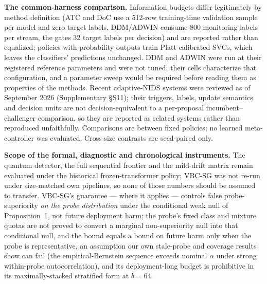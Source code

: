 \documentclass[a4paper,fleqn]{cas-sc}
\begin{document}
\textbf{The common-harness comparison.} Information budgets differ legitimately by method definition (ATC and DoC use a 512-row training-time validation sample per model and zero target labels, DDM/ADWIN consume 800 monitoring labels per stream, the gates 32 target labels per decision) and are reported rather than equalized; policies with probability outputs train Platt-calibrated SVCs, which leaves the classifiers' predictions unchanged. DDM and ADWIN were run at their registered reference parameters and were not tuned; their cells characterize that configuration, and a parameter sweep would be required before reading them as properties of the methods. Recent adaptive-NIDS systems were reviewed as of September 2026 (Supplementary \S S11); their triggers, labels, update semantics and decision units are not decision-equivalent to a per-proposal incumbent--challenger comparison, so they are reported as related systems rather than reproduced unfaithfully. Comparisons are between fixed policies; no learned meta-controller was evaluated. Cross-size contrasts are seed-paired only.

\textbf{Scope of the formal, diagnostic and chronological instruments.} The quantum detector, the full sequential frontier and the mild-drift matrix remain evaluated under the historical frozen-transformer policy; VBC-SG was not re-run under size-matched own pipelines, so none of those numbers should be assumed to transfer. VBC-SG's guarantee --- where it applies --- controls false probe-superiority \emph{on the probe distribution} under the conditional weak null of Proposition~1, not future deployment harm; the probe's fixed class and mixture quotas are not proved to convert a marginal non-superiority null into that conditional null, and the bound equals a bound on future harm only when the probe is representative, an assumption our own stale-probe and coverage results show can fail (the empirical-Bernstein sequence exceeds nominal $\alpha$ under strong within-probe autocorrelation), and its deployment-long budget is prohibitive in its maximally-stacked stratified form at $b{=}64$.
\end{document}
